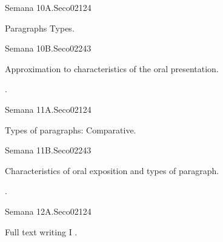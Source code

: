 \begin{syllabus}
\begin{unit}{}{Semana 10A.}{Seco02}{12}{4}
   \begin{topics}
      \item Paragraphs Types.
   \end{topics}
   \begin{learningoutcomes}
      \item 
   \end{learningoutcomes}
\end{unit}

\begin{unit}{}{Semana 10B.}{Seco02}{24}{3}
   \begin{topics}
      \item Approximation to characteristics of the oral presentation.
   \end{topics}

   \begin{learningoutcomes}
      \item .
      \end{learningoutcomes}
\end{unit}


\begin{unit}{}{Semana 11A.}{Seco02}{12}{4}
   \begin{topics}
      \item Types of paragraphs: Comparative.
   \end{topics}
   \begin{learningoutcomes}
      \item 
   \end{learningoutcomes}
\end{unit}

\begin{unit}{}{Semana 11B.}{Seco02}{24}{3}
   \begin{topics}
      \item Characteristics of oral exposition and types of paragraph.
   \end{topics}

   \begin{learningoutcomes}
      \item .
      \end{learningoutcomes}
\end{unit}


\begin{unit}{}{Semana 12A.}{Seco02}{12}{4}
   \begin{topics}
      \item Full text writing I .
   \end{topics}
   \begin{learningoutcomes}
      \item 
   \end{learningoutcomes}
\end{unit}


\end{syllabus}
